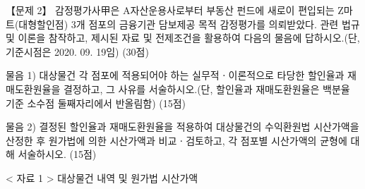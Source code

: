 \begin{longquestion}{【문제 2】}
감정평가사甲은 A자산운용사로부터 부동산 펀드에 새로이 편입되는 Z마트(대형할인점) 3개 점포의 금융기관 담보제공 목적 감정평가를 의뢰받았다. 관련 법규 및 이론을 참작하고, 제시된 자료 및 전제조건을 활용하여 다음의 물음에 답하시오.(단, 기준시점은 2020. 09. 19임) (30점) \par
\medskip\noindent 물음 1) 대상물건 각 점포에 적용되어야 하는 실무적ㆍ이론적으로 타당한 할인율과 재매도환원율을 결정하고, 그 사유를 서술하시오.(단, 할인율과 재매도환원율은 백분율 기준 소수점 둘째자리에서 반올림함) (15점) \par
\medskip\noindent 물음 2) 결정된 할인율과 재매도환원율을 적용하여 대상물건의 수익환원법 시산가액을 산정한 후 원가법에 의한 시산가액과 비교ㆍ검토하고, 각 점포별 시산가액의 균형에 대해 서술하시오. (15점) \par
< 자료 1 > 대상물건 내역 및 원가법 시산가액 \par
{\small\centering\renewcommand{\arraystretch}{1.25}
\par}


\end{longquestion}
